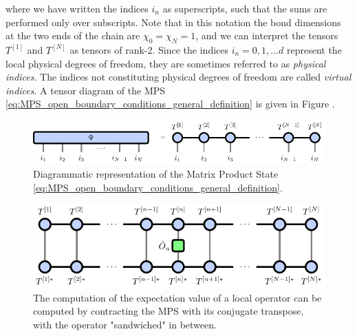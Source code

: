 where we have written the indices $i_n$ as superscripts, such that the sums are performed only over subscripts. Note that in this notation the bond dimensions at the two ends of the chain are $\chi_0 = \chi_{N} = 1$, and we can interpret the tensors $T^{[1]}$ and $T^{[N]}$ as tensors of rank-2. Since the indices $i_n = 0, 1, \dots d$ represent the local physical degrees of freedom, they are sometimes referred to as \textit{physical indices}. The indices not constituting physical degrees of freedom are called \textit{virtual indices}. A tensor diagram of the MPS \eqref{eq:MPS_open_boundary_conditions_general_definition} is given in Figure .\par
\begin{figure}
	\centering
	\includegraphics[scale=1]{figures/tikz/Tensor_Networks/mps_basic/mps_basic.pdf}
	\caption{Diagrammatic representation of the Matrix Product State \ref{eq:MPS_open_boundary_conditions_general_definition}.}
	\label{fig:mps_general}
\end{figure}
\begin{figure}
\centering
\includegraphics[scale=1]{figures/tikz/Tensor_Networks/mps_local_expectation_value/mps_local_expectation_value.pdf}
\caption{The computation of the expectation value of a local operator can be computed by contracting the MPS with its conjugate transpose, with the operator "sandwiched" in between.}
\label{fig:mps_local_expectation_value}
\end{figure}
